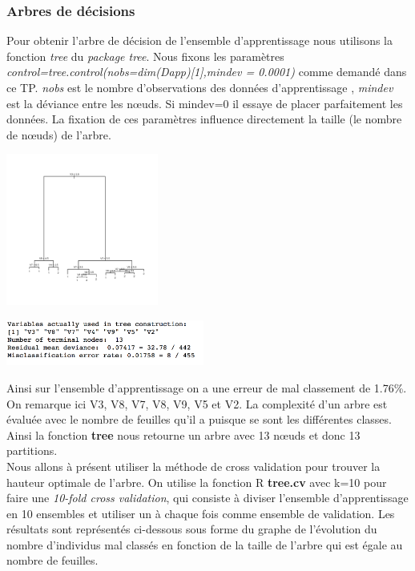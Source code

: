 \documentclass[10pt]{article}
\begin{document}
\subsubsection{Arbres de décisions}
Pour obtenir l'arbre de décision de l'ensemble d'apprentissage nous utilisons la fonction \textit{tree} du \textit{package tree}. Nous fixons les paramètres\\  \textit{control=tree.control(nobs=dim(Dapp)[1],mindev = 0.0001)}  comme demandé dans ce TP. \textit{nobs} est le nombre d'observations des données d'apprentissage , \textit{mindev} est la déviance entre les nœuds. Si mindev=0 il essaye de placer parfaitement les données. La fixation de ces paramètres influence directement la taille (le nombre de nœuds) de l'arbre.\\
\begin{minipage}{.5\textwidth}
	\includegraphics[width=50mm]{Figures/bcw_apptree.png}
\end{minipage}%
\hspace{0.001\linewidth}
\begin{minipage}{.5\textwidth}
	\includegraphics[width=65mm]{Figures/bcw_apptree_summary.png}
\end{minipage}

Ainsi sur l'ensemble d'apprentissage on a une erreur de mal classement de 1.76\%. On remarque ici V3, V8, V7, V8, V9, V5 et V2. La  complexité d'un arbre est évaluée avec le nombre de feuilles qu'il a puisque se sont les différentes classes. Ainsi la fonction \textbf{tree} nous retourne un arbre avec 13 nœuds et donc 13 partitions.\\
Nous allons à présent utiliser la méthode de cross validation pour trouver la hauteur optimale de l'arbre. On utilise la fonction R \textbf{tree.cv} avec k=10 pour faire une \textit{10-fold cross validation}, qui consiste à diviser l'ensemble d'apprentissage en 10 ensembles et utiliser un à chaque fois comme ensemble de validation.  Les résultats sont représentés ci-dessous sous forme du graphe de l'évolution du nombre d'individus mal classés en fonction de la taille de l'arbre qui est égale au nombre de feuilles.
\end{document}
